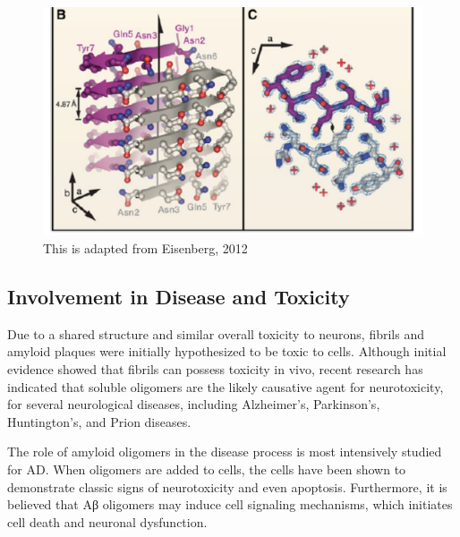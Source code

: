 
\begin{figure}
  \centering
  \includegraphics[width=6in]{figures/introduction/fibril_xray_model.pdf}
  \caption[Characteristic cross-$\beta$ spacings from X-ray fibre diffraction studies of amyloid fibrils]{This is adapted from Eisenberg, 2012}
  \label{fig:fibril_xray_model}
\end{figure}

\subsection{Involvement in Disease and Toxicity}

Due to a shared structure and similar overall toxicity to neurons, fibrils and amyloid plaques were initially hypothesized to be toxic to cells.  Although initial evidence showed that fibrils can possess toxicity in vivo, recent research has indicated that soluble oligomers are the likely causative agent for neurotoxicity, for several neurological diseases, including Alzheimer's, Parkinson's, Huntington's, and Prion diseases.\cite{Haass:2007db,Xue:2009da} %

The role of amyloid oligomers in the disease process is most intensively studied for AD. When oligomers are added to cells, the cells have been shown to demonstrate classic signs of neurotoxicity and even apoptosis.\cite{Cappai:2007bc,Lambert:1998ve,Walsh:2002p2566,Shankar:2008bg} Furthermore, it is believed that Aβ oligomers may induce cell signaling mechanisms, which initiates cell death and neuronal dysfunction.\cite{Cappai:2007bc}

